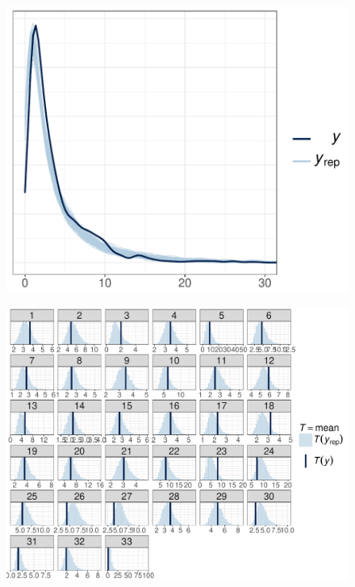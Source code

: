 \documentclass[11pt]{article}
\begin{document}
\begin{figure}[ht]
  \centering
  \includegraphics[height = 0.5\textheight,width=\textwidth,keepaspectratio=true]{figure/ppc_dens_zoom_cweib_base}
  \caption{ }
  \label{fig:dens_overlay_zoom}
\end{figure}


\begin{figure}[ht]
  \centering
  \includegraphics[height = 0.5\textheight,width=\textwidth,keepaspectratio=true]{figure/ppc_mean_group_cweib_base}
  \caption{ }
  \label{fig:group_mean}
\end{figure}
\end{document}
